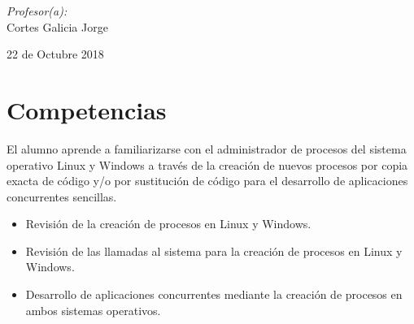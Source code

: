 \documentclass[12pt]{article}
\begin{document}
\begin{titlepage}
\begin{center}
\begin{minipage}{0.5\textwidth}
\begin{flushleft}
\begin{tabular}{ll}
                         
                    \end{tabular}
                    \end{flushleft}
                \end{minipage}%
                \begin{minipage}{0.5\textwidth}
                    \begin{flushright} \large
                        \emph{Profesor(a):} \\
                        Cortes Galicia Jorge  \\
                    \end{flushright}
                \end{minipage}
                
                \vfill
                
                {\large 22 de Octubre 2018}
            \end{center}
        \end{titlepage}
    
    \tableofcontents
    \newpage


    \section{Competencias}
    El alumno aprende a familiarizarse con el administrador de procesos del sistema operativo Linux y Windows a través de la creación de nuevos procesos por copia exacta de código y/o por sustitución de código para el desarrollo de aplicaciones concurrentes sencillas.
    \begin{itemize}
        \item[\Checkmark] Revisión de la creación de procesos en Linux y Windows.

        \item[\Checkmark] Revisión de las llamadas al sistema para la creación de procesos en Linux y Windows.

        \item[\Checkmark] Desarrollo de aplicaciones concurrentes mediante la creación de procesos en ambos sistemas operativos.
    \end{itemize}
    
\end{document}
